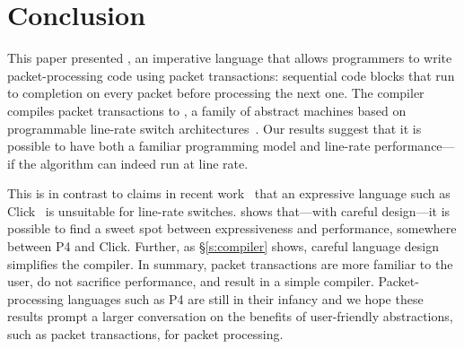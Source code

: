 \section{Conclusion}
\label{s:conclusion}

This paper presented \pktlanguage, an imperative language that allows
programmers to write packet-processing code using packet transactions:
sequential code blocks that run to completion on every packet before processing
the next one. The \pktlanguage compiler compiles packet transactions to
\absmachine, a family of abstract machines based on programmable line-rate
switch architectures~\cite{flexpipe, xpliant, rmt}. Our results suggest that it
is possible to have both a familiar programming model and line-rate
performance---if the algorithm can indeed run at line rate.

This is in contrast to claims in recent work~\cite{p4} that an expressive
language such as Click~\cite{click} is unsuitable for line-rate switches.
\pktlanguage shows that---with careful design---it is possible to find a sweet
spot between expressiveness and performance, somewhere between P4 and Click.
Further, as \S\ref{s:compiler} shows, careful language design simplifies the
compiler.  In summary, packet transactions are more familiar to the user, do
not sacrifice performance, and result in a simple compiler.  Packet-processing
languages such as P4 are still in their infancy and we hope these results
prompt a larger conversation on the benefits of user-friendly abstractions,
such as packet transactions, for packet processing.
